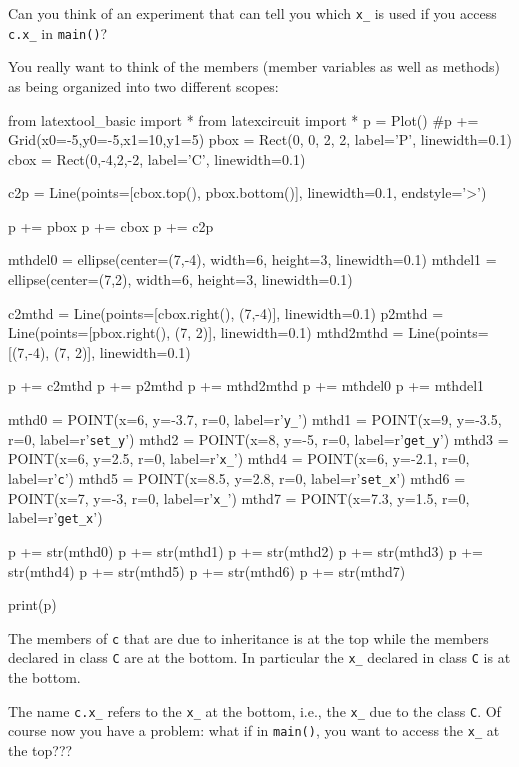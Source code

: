 \begin{ex} Can you think of an experiment that can tell you
which \verb!x_! is used if you access \verb!c.x_! in \verb!main()!?
\end{ex}
You really want to think of the members (member variables as well as
methods) as being organized into two different scopes:
\begin{python}
from latextool_basic import *
from latexcircuit import *
p = Plot()
#p += Grid(x0=-5,y0=-5,x1=10,y1=5)
pbox = Rect(0, 0, 2, 2, label='P', linewidth=0.1)
cbox = Rect(0,-4,2,-2, label='C', linewidth=0.1)

c2p = Line(points=[cbox.top(), pbox.bottom()], linewidth=0.1, endstyle='>')

p += pbox
p += cbox
p += c2p

mthdel0 = ellipse(center=(7,-4), width=6, height=3, linewidth=0.1)
mthdel1 = ellipse(center=(7,2), width=6, height=3, linewidth=0.1)

c2mthd = Line(points=[cbox.right(), (7,-4)], linewidth=0.1)
p2mthd = Line(points=[pbox.right(), (7, 2)], linewidth=0.1)
mthd2mthd = Line(points=[(7,-4), (7, 2)], linewidth=0.1)

p += c2mthd
p += p2mthd
p += mthd2mthd
p += mthdel0
p += mthdel1

mthd0 = POINT(x=6, y=-3.7, r=0, label=r'\verb!y_!')
mthd1 = POINT(x=9, y=-3.5, r=0, label=r'\verb!set_y!')
mthd2 = POINT(x=8, y=-5, r=0, label=r'\verb!get_y!')
mthd3 = POINT(x=6, y=2.5, r=0, label=r'\verb!x_!')
mthd4 = POINT(x=6, y=-2.1, r=0, label=r'\large\verb!c!')
mthd5 = POINT(x=8.5, y=2.8, r=0, label=r'\verb!set_x!')
mthd6 = POINT(x=7, y=-3, r=0, label=r'\verb!x_!')
mthd7 = POINT(x=7.3, y=1.5, r=0, label=r'\verb!get_x!')

p += str(mthd0)
p += str(mthd1)
p += str(mthd2)
p += str(mthd3)
p += str(mthd4)
p += str(mthd5)
p += str(mthd6)
p += str(mthd7)

print(p)
\end{python}
The members of \verb!c! that are due to inheritance is at the top while
the members declared in class \verb!C! are at the bottom. In particular
the \verb!x_! declared in class \verb!C! is at the bottom.

The name \verb!c.x_! refers to the \verb!x_! at the bottom, i.e., the
\verb!x_! due to the class \verb!C!. Of course now you have a problem:
what if in \verb!main()!, you want to access the \verb!x_! at the
top???

